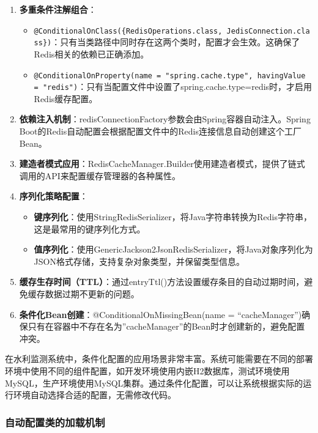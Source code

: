 \begin{enumerate}
\def\labelenumi{\arabic{enumi}.}
\item
  \textbf{多重条件注解组合}：

  \begin{itemize}
  \tightlist
  \item
    \texttt{@ConditionalOnClass(\{RedisOperations.class,\ JedisConnection.class\})}：只有当类路径中同时存在这两个类时，配置才会生效。这确保了Redis相关的依赖已正确添加。
  \item
    \texttt{@ConditionalOnProperty(name\ =\ "spring.cache.type",\ havingValue\ =\ "redis")}：只有当配置文件中设置了spring.cache.type=redis时，才启用Redis缓存配置。
  \end{itemize}
\item
  \textbf{依赖注入机制}：redisConnectionFactory参数会由Spring容器自动注入。Spring Boot的Redis自动配置会根据配置文件中的Redis连接信息自动创建这个工厂Bean。
\item
  \textbf{建造者模式应用}：RedisCacheManager.Builder使用建造者模式，提供了链式调用的API来配置缓存管理器的各种属性。
\item
  \textbf{序列化策略配置}：

  \begin{itemize}
  \tightlist
  \item
    \textbf{键序列化}：使用StringRedisSerializer，将Java字符串转换为Redis字符串，这是最常用的键序列化方式。
  \item
    \textbf{值序列化}：使用GenericJackson2JsonRedisSerializer，将Java对象序列化为JSON格式存储，支持复杂对象类型，并保留类型信息。
  \end{itemize}
\item
  \textbf{缓存生存时间（TTL）}：通过entryTtl()方法设置缓存条目的自动过期时间，避免缓存数据过期不更新的问题。
\item
  \textbf{条件化Bean创建}：@ConditionalOnMissingBean(name = ``cacheManager'')确保只有在容器中不存在名为''cacheManager''的Bean时才创建新的，避免配置冲突。
\end{enumerate}

在水利监测系统中，条件化配置的应用场景非常丰富。系统可能需要在不同的部署环境中使用不同的组件配置，如开发环境使用内嵌H2数据库，测试环境使用MySQL，生产环境使用MySQL集群。通过条件化配置，可以让系统根据实际的运行环境自动选择合适的配置，无需修改代码。

\subsubsection{自动配置类的加载机制}\label{ux81eaux52a8ux914dux7f6eux7c7bux7684ux52a0ux8f7dux673aux5236}

